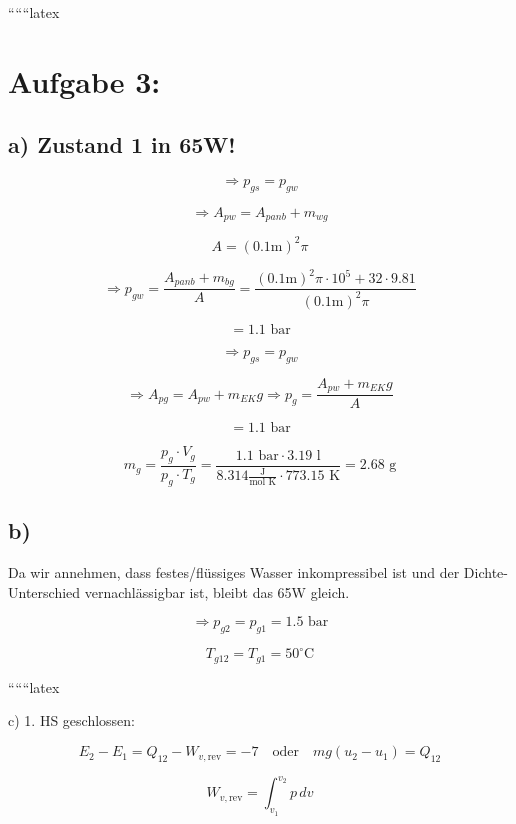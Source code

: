 
``````latex


\section*{Aufgabe 3:}

\subsection*{a) Zustand 1 in 65W!}

\[
\Rightarrow p_{gs} = p_{gw}
\]

\[
\Rightarrow A_{pw} = A_{panb} + m_{wg}
\]

\[
A = (0.1 \text{m})^2 \pi
\]

\[
\Rightarrow p_{gw} = \frac{A_{panb} + m_{bg}}{A} = \frac{(0.1 \text{m})^2 \pi \cdot 10^5 + 32 \cdot 9.81}{(0.1 \text{m})^2 \pi}
\]

\[
= 1.1 \text{ bar}
\]

\[
\Rightarrow p_{gs} = p_{gw}
\]

\[
\Rightarrow A_{pg} = A_{pw} + m_{EK} g \Rightarrow p_{g} = \frac{A_{pw} + m_{EK} g}{A}
\]

\[
= 1.1 \text{ bar}
\]

\[
m_{g} = \frac{p_{g} \cdot V_{g}}{p_{g} \cdot T_{g}} = \frac{1.1 \text{ bar} \cdot 3.19 \text{ l}}{8.314 \frac{\text{J}}{\text{mol K}} \cdot 773.15 \text{ K}} = 2.68 \text{ g}
\]

\subsection*{b)}

Da wir annehmen, dass festes/flüssiges Wasser inkompressibel ist und der Dichte-Unterschied vernachlässigbar ist, bleibt das 65W gleich. 

\[
\Rightarrow p_{g2} = p_{g1} = 1.5 \text{ bar}
\]

\[
T_{g12} = T_{g1} = 50^\circ \text{C}
\]

``````latex


c) 1. HS geschlossen:

\begin{equation}
E_2 - E_1 = Q_{12} - W_{v, \text{rev}} = -7 \quad \text{oder} \quad mg(u_2 - u_1) = Q_{12}
\end{equation}

\begin{equation}
W_{v, \text{rev}} = \int_{v_1}^{v_2} p \, dv
\end{equation}


